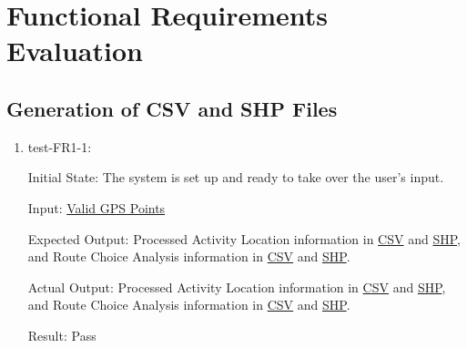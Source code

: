 \documentclass[12pt, titlepage]{article}
\begin{document}
\newpage

\tableofcontents

\listoftables %

\listoffigures %

\newpage


\section{Functional Requirements Evaluation}

\subsection{Generation of CSV and SHP Files}
\begin{enumerate}
    \item test-FR1-1:\label{test-FR1-1}
    
    Initial State: The system is set up and ready to take over the user’s input.
    
    Input: \href{https://github.com/paezha/PyERT-BLACK/blob/rev0-test/quarto-example/data/sample-gps/sample-gps-1.csv}{Valid GPS Points}
    
    Expected Output: Processed Activity Location information in \href{https://github.com/paezha/PyERT-BLACK/blob/rev0-test/test/test_data/fr-tests/fr1-1-expected-aloc.csv}{CSV} and \href{https://github.com/paezha/PyERT-BLACK/blob/rev0-test/test/test_data/fr-tests/fr1-1-expected-aloc.shp}{SHP}, and Route Choice Analysis information in \href{https://github.com/paezha/PyERT-BLACK/blob/rev0-test/test/test_data/fr-tests/fr1-1-expected-rca.csv}{CSV} and \href{https://github.com/paezha/PyERT-BLACK/blob/rev0-test/test/test_data/fr-tests/fr1-1-expected-rca.shp}{SHP}.
    
    Actual Output: Processed Activity Location information in \href{https://github.com/paezha/PyERT-BLACK/blob/rev0-test/test/test_data/fr-tests/fr1-1-out-aloc.csv}{CSV} and \href{https://github.com/paezha/PyERT-BLACK/blob/rev0-test/test/test_data/fr-tests/fr1-1-out-aloc.shp}{SHP}, and Route Choice Analysis information in \href{https://github.com/paezha/PyERT-BLACK/blob/rev0-test/test/test_data/fr-tests/fr1-1-out-rca.csv}{CSV} and \href{https://github.com/paezha/PyERT-BLACK/blob/rev0-test/test/test_data/fr-tests/fr1-1-out-rca.shp}{SHP}.
    
    Result: Pass
\end{enumerate}
\end{document}
